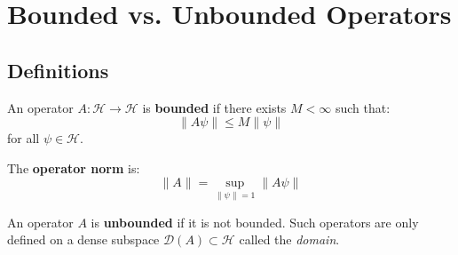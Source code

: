 \section{Bounded vs. Unbounded Operators}

\subsection{Definitions}

\begin{definition}\label{def:bounded-operator}
An operator $A: \mathcal{H} \to \mathcal{H}$ is \textbf{bounded}\cite{reed1980,rudin1976} if there exists $M < \infty$ such that:
\begin{equation}
\| A\psi \| \leq M \| \psi \|
\end{equation}
for all $\psi \in \mathcal{H}$.

The \textbf{operator norm} is:
\begin{equation}
\| A \| = \sup_{\|\psi\|=1} \| A\psi \|
\end{equation}
\end{definition}

\begin{definition}\label{def:unbounded-operator}
An operator $A$ is \textbf{unbounded} if it is not bounded. Such operators are only defined on a dense subspace $\mathcal{D}(A) \subset \mathcal{H}$ called the \textit{domain}.
\end{definition}

